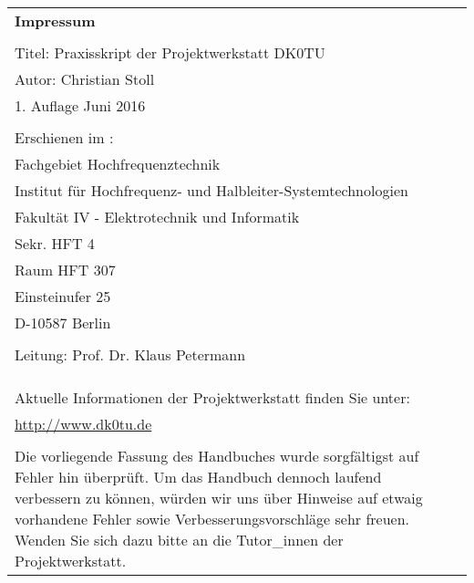 \thispagestyle{empty}

\begin{tabular}{p{13cm} p{1cm}}
\textbf{Impressum} &\\
&\\
Titel: Praxisskript der Projektwerkstatt DK0TU&\\
Autor: Christian Stoll&\\
1. Auflage Juni 2016 &\\
&\\
Erschienen im :&\\
Fachgebiet Hochfrequenztechnik &\\
Institut für Hochfrequenz- und Halbleiter-Systemtechnologien&\\
Fakultät IV - Elektrotechnik und Informatik &\\
Sekr. HFT 4 &\\
Raum HFT 307 &\\
Einsteinufer 25 &\\
D-10587 Berlin &\\
&\\
Leitung: Prof. Dr. Klaus Petermann &\\
&\\
&\\
&\\
Aktuelle Informationen der Projektwerkstatt finden Sie unter:  &\\
\url{http://www.dk0tu.de} &\\
&\\
Die vorliegende Fassung des Handbuches wurde sorgfältigst auf Fehler hin überprüft. Um das Handbuch dennoch laufend verbessern zu können, würden wir uns über Hinweise auf etwaig vorhandene Fehler sowie Verbesserungsvorschläge sehr freuen. Wenden Sie sich dazu bitte an die Tutor\_innen der Projektwerkstatt. &\\
\end{tabular}



